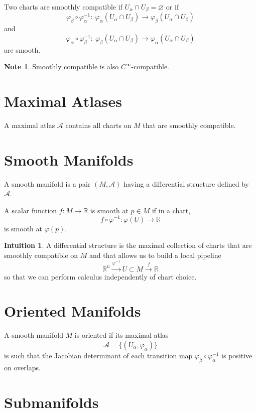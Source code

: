 \documentclass[11pt]{report}
\theoremstyle{definition}
\newtheorem{note}[definition]{Note}
\newtheorem{intuition}[definition]{Intuition}
\theoremstyle{plain}
\theoremstyle{remark}
\newcommand{\R}{\mathbb{R}}
\begin{document}
Two charts are smoothly compatible if $U_\alpha\cap U_\beta=\varnothing$ or if
\[
\varphi_\beta\circ \varphi_\alpha^{-1}:\ \varphi_\alpha(U_\alpha\cap U_\beta)\to \varphi_\beta(U_\alpha\cap U_\beta)
\]
and
\[
\varphi_\alpha\circ \varphi_\beta^{-1}:\ \varphi_\beta(U_\alpha\cap U_\beta)\to \varphi_\alpha(U_\alpha\cap U_\beta)
\]
are smooth.

\begin{note}
Smoothly compatible is also $C^\infty$-compatible.
\end{note}

\section{Maximal Atlases}

A maximal atlas $\mathcal A$ contains all charts on $M$ that are smoothly compatible.

\section{Smooth Manifolds}

A smooth manifold is a pair $(M,\mathcal A)$ having a differential structure defined by $\mathcal A$.

A scalar function $f:M\to \R$ is smooth at $p\in M$ if in a chart,
\[
f\circ \varphi^{-1}:\varphi(U)\to \R
\]
is smooth at $\varphi(p)$.

\begin{intuition}
A differential structure is the maximal collection of charts that are smoothly compatible on $M$ and that allows us to build a local pipeline
\[
\R^n \xrightarrow{\varphi^{-1}} U\subset M \xrightarrow{f} \R
\]
so that we can perform calculus independently of chart choice.
\end{intuition}

\section{Oriented Manifolds}

A smooth manifold $M$ is oriented if its maximal atlas
\[
\mathcal A=\{(U_\alpha,\varphi_\alpha)\}
\]
is such that the Jacobian determinant of each transition map $\varphi_\beta\circ\varphi_\alpha^{-1}$ is positive on overlaps.

\section{Submanifolds}
\end{document}
